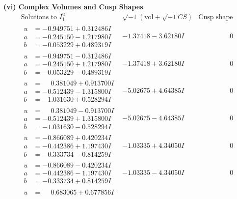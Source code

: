 \documentclass[1p]{elsarticle_modified}
\theoremstyle{definition}
\newcommand{\I}{\sqrt{-1}}
\begin{document}
\newpage\flushleft \textbf{(vi) Complex Volumes and Cusp Shapes}
$$\begin{array}{c|c|c}  
\text{Solutions to }I^u_{1}& \I (\text{vol} + \sqrt{-1}CS) & \text{Cusp shape}\\
 \hline 
\begin{aligned}
u &= -0.949751 + 0.312486 I \\
a &= -0.245150 - 1.217980 I \\
b &= -0.053229 + 0.489319 I\end{aligned}
 & -1.37418 - 3.62180 I & \phantom{-0.000000 } 0 \\ \hline\begin{aligned}
u &= -0.949751 - 0.312486 I \\
a &= -0.245150 + 1.217980 I \\
b &= -0.053229 - 0.489319 I\end{aligned}
 & -1.37418 + 3.62180 I & \phantom{-0.000000 } 0 \\ \hline\begin{aligned}
u &= \phantom{-}0.381049 + 0.913700 I \\
a &= -0.512439 - 1.315800 I \\
b &= -1.031630 + 0.528294 I\end{aligned}
 & -5.02675 + 4.64385 I & \phantom{-0.000000 } 0 \\ \hline\begin{aligned}
u &= \phantom{-}0.381049 - 0.913700 I \\
a &= -0.512439 + 1.315800 I \\
b &= -1.031630 - 0.528294 I\end{aligned}
 & -5.02675 - 4.64385 I & \phantom{-0.000000 } 0 \\ \hline\begin{aligned}
u &= -0.866089 + 0.420234 I \\
a &= -0.442386 + 1.197430 I \\
b &= -0.333734 - 0.814259 I\end{aligned}
 & -1.03335 + 4.34050 I & \phantom{-0.000000 } 0 \\ \hline\begin{aligned}
u &= -0.866089 - 0.420234 I \\
a &= -0.442386 - 1.197430 I \\
b &= -0.333734 + 0.814259 I\end{aligned}
 & -1.03335 - 4.34050 I & \phantom{-0.000000 } 0 \\ \hline\begin{aligned}
u &= \phantom{-}0.683065 + 0.677856 I \\

\end{aligned}
\end{array}$$
\end{document}
